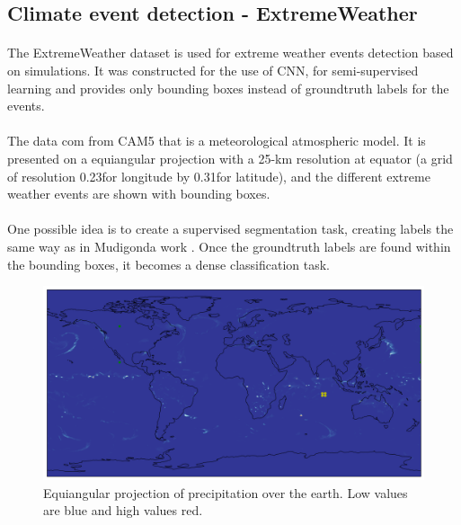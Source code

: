 \documentclass[11pt]{report}
\begin{document}
\subsection{Climate event detection - ExtremeWeather}
\paragraph*{}
The ExtremeWeather dataset \cite{racah_extremeweather:_2017} is used for extreme weather events detection based on simulations. It was constructed for the use of CNN, for semi-supervised learning and provides only bounding boxes instead of groundtruth labels for the events.


\paragraph*{}
The data com from CAM5 \cite{neale_description_nodate} that is a meteorological atmospheric model. It is presented on a equiangular projection with a 25-km resolution at equator (a grid of resolution 0.23\degree for longitude by 0.31\degree for latitude), and the different extreme weather events are shown with bounding boxes.

\paragraph*{}
One possible idea is to create a supervised segmentation task, creating labels the same way as in Mudigonda work \cite{mudigonda_segmenting_nodate}. Once the groundtruth labels are found within the bounding boxes, it becomes a dense classification task.

\begin{figure}[!ht]
    \centering
    \includegraphics[width=0.99\linewidth]{EW_day1.png}
    \caption{Equiangular projection of precipitation over the earth. Low values are blue and high values red.}
    \label{fig:EW_PREC}
\end{figure}
\end{document}
